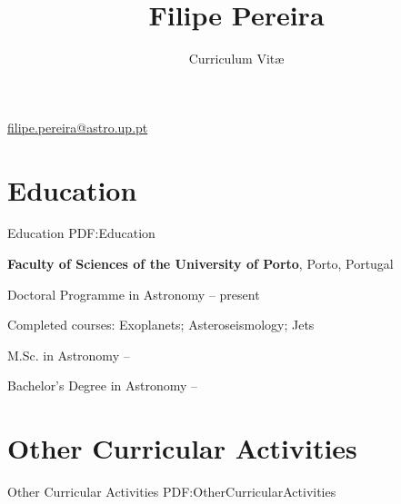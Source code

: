 \documentclass[letterpaper,10pt,oneside]{article}
\newcommand{\CVAuthor}{Filipe Pereira}
\newcommand{\CVTitle}{Curriculum Vit\ae}
\newcommand{\CVWebpage}{http://www.example.com/johndoe}
\begin{document}

\title{\CVAuthor}
\subtitle{\CVTitle}

\begin{subtitle}
\par
\href{mailto:filipe.pereira@astro.up.pt}
{filipe.pereira@astro.up.pt}
\end{subtitle}

\begin{body}


\section
{Education}
{Education}
{PDF:Education}

{\textbf{Faculty of Sciences of the University of Porto}},
Porto, Portugal

\GapNoBreak
\BulletItem
Doctoral Programme in Astronomy
\hfill
{} --
present
\begin{detail}
\SubBulletItem
Completed courses: Exoplanets; Asteroseismology; Jets
\end{detail}

\GapNoBreak
\BulletItem
M.Sc. in Astronomy
\hfill
{} --


\GapNoBreak
\BulletItem
Bachelor's Degree in Astronomy
\hfill
{} --


\section
{Other Curricular Activities}
{Other Curricular Activities}
{PDF:OtherCurricularActivities}


\end{body}
\end{document}
